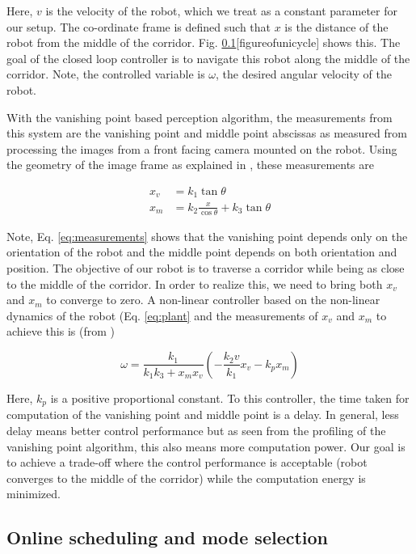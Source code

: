 Here, $v$ is the velocity of the robot, which we treat as a constant parameter for our setup. The co-ordinate frame is defined such that $x$ is the distance of the robot from the middle of the corridor. Fig. \ref{}[figureofunicycle] shows this. The goal of the closed loop controller is to navigate this robot along the middle of the corridor. Note, the controlled variable is $\omega$, the desired angular velocity of the robot.

With the vanishing point based perception algorithm, the measurements from this system are the vanishing point and middle point abscissas as measured from processing the images from a front facing camera mounted on the robot. Using the geometry of the image frame as explained in \cite{VP2}, these measurements are

\begin{subequations}
\begin{align}
x_v &= k_1\tan\theta \nonumber \\
x_m &= k_2\frac{x}{\cos\theta} + k_3\tan\theta
\end{align}
\label{eq:measurements}
\end{subequations}

Note, Eq. \ref{eq:measurements} shows that the vanishing point depends only on the orientation of the robot and the middle point depends on both orientation and position. The objective of our robot is to traverse a corridor while being as close to the middle of the corridor. In order to realize this, we need to bring both $x_v$ and $x_m$ to converge to zero. A non-linear controller based on the non-linear dynamics of the robot (Eq. \ref{eq:plant} and the measurements of $x_v$ and $x_m$ to achieve this is (from \cite{VP2})

\begin{equation}
\omega = \frac{k_1}{k_1k_3+x_mx_v}(-\frac{k_2v}{k_1}x_v -k_px_m)
\label{eq:controller}
\end{equation}

Here, $k_p$ is a positive proportional constant. To this controller, the time taken for computation of the vanishing point and middle point is a delay. In general, less delay means better control performance but as seen from the profiling of the vanishing point algorithm, this also means more computation power. Our goal is to achieve a trade-off where the control performance is acceptable (robot converges to the middle of the corridor) while the computation energy is minimized. 

\subsection{Online scheduling and mode selection}


